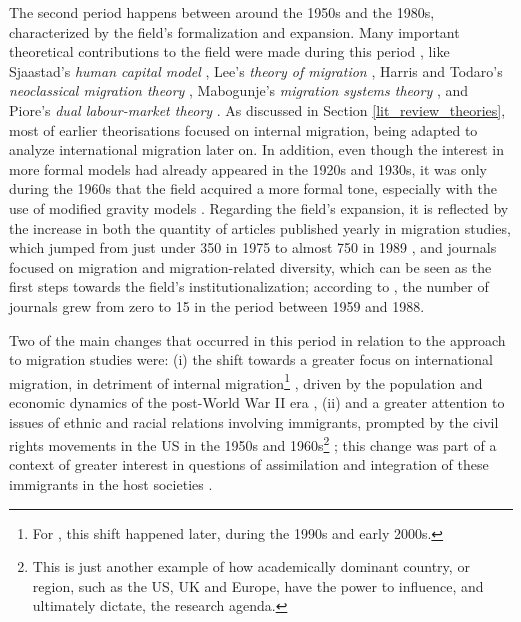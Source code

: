 The second period happens between around the 1950s and the 1980s, characterized by the field's formalization and expansion. Many important theoretical contributions to the field were made during this period \citep{massey_theories_1993, de_haas_theory_2021}, like Sjaastad's \textit{human capital model} \citep{sjaastad_costs_1962}, Lee’s \textit{theory of migration} \citep{lee_theory_1966}, Harris and Todaro’s \textit{neoclassical migration theory} \citep{todaro_model_1969, harris_migration_1970}, Mabogunje's \textit{migration systems theory} \citep{mabogunje_systems_1970}, and Piore’s \textit{dual labour-market theory} \citep{piore_birds_1979}. As discussed in Section \ref{lit_review_theories}, most of earlier theorisations focused on internal migration, being adapted to analyze international migration later on. In addition, even though the interest in more formal models had already appeared in the 1920s and 1930s, it was only during the 1960s that the field acquired a more formal tone, especially with the use of modified gravity models \citep{greenwood_early_2003}. Regarding the field's expansion, it is reflected by the increase in both the quantity of articles published yearly in migration studies, which jumped from just under 350 in 1975 to almost 750 in 1989 \citep{levy_between_2020, scholten_introduction_2022}, and journals focused on migration and migration-related diversity, which can be seen as the first steps towards the field's institutionalization; according to \cite{pisarevskaya_mapping_2020}, the number of journals grew from zero to 15 in the period between 1959 and 1988. 

Two of the main changes that occurred in this period in relation to the approach to migration studies were: (i) the shift towards a greater focus on international migration, in detriment of internal migration\footnote{For \cite{king_mind_2010}, this shift happened later, during the 1990s and early 2000s.} \citep{scholten_introduction_2022}, driven by the population and economic dynamics of the post-World War II era \citep{castles_migration_2014}, (ii) and a greater attention to issues of ethnic and racial relations involving immigrants, prompted by the civil rights movements in the US in the 1950s and 1960s\footnote{This is just another example of how academically dominant country, or region, such as the US, UK and Europe, have the power to influence, and ultimately dictate, the research agenda.} \citep{portes_immigrant_1978, pedraza-bailey_immigration_1990}; this change was part of a context of greater interest in questions of assimilation and integration of these immigrants in the host societies \citep{scholten_introduction_2022}.

